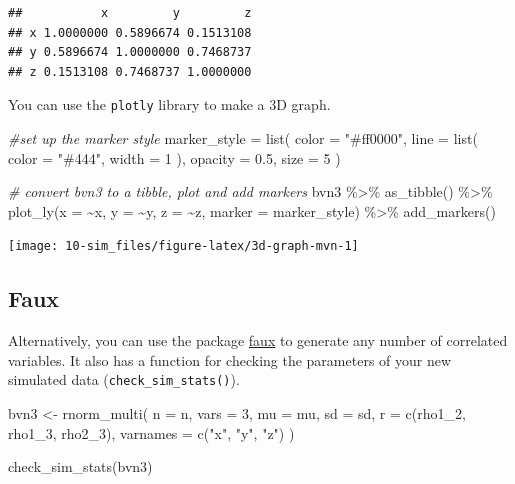 \documentclass[
  oneside]{book}
\newenvironment{Shaded}{\begin{snugshade}}{\end{snugshade}}
\newcommand{\AttributeTok}[1]{\textcolor[rgb]{0.77,0.63,0.00}{#1}}
\newcommand{\CommentTok}[1]{\textcolor[rgb]{0.56,0.35,0.01}{\textit{#1}}}
\newcommand{\DecValTok}[1]{\textcolor[rgb]{0.00,0.00,0.81}{#1}}
\newcommand{\FloatTok}[1]{\textcolor[rgb]{0.00,0.00,0.81}{#1}}
\newcommand{\FunctionTok}[1]{\textcolor[rgb]{0.00,0.00,0.00}{#1}}
\newcommand{\NormalTok}[1]{#1}
\newcommand{\OtherTok}[1]{\textcolor[rgb]{0.56,0.35,0.01}{#1}}
\newcommand{\SpecialCharTok}[1]{\textcolor[rgb]{0.00,0.00,0.00}{#1}}
\newcommand{\StringTok}[1]{\textcolor[rgb]{0.31,0.60,0.02}{#1}}
\begin{document}
\begin{verbatim}
##           x         y         z
## x 1.0000000 0.5896674 0.1513108
## y 0.5896674 1.0000000 0.7468737
## z 0.1513108 0.7468737 1.0000000
\end{verbatim}

You can use the \texttt{plotly} library to make a 3D graph.

\begin{Shaded}
\begin{Highlighting}[]
\CommentTok{\#set up the marker style}
\NormalTok{marker\_style }\OtherTok{=} \FunctionTok{list}\NormalTok{(}
    \AttributeTok{color =} \StringTok{"\#ff0000"}\NormalTok{, }
    \AttributeTok{line =} \FunctionTok{list}\NormalTok{(}
      \AttributeTok{color =} \StringTok{"\#444"}\NormalTok{, }
      \AttributeTok{width =} \DecValTok{1}
\NormalTok{    ), }
    \AttributeTok{opacity =} \FloatTok{0.5}\NormalTok{,}
    \AttributeTok{size =} \DecValTok{5}
\NormalTok{  )}

\CommentTok{\# convert bvn3 to a tibble, plot and add markers}
\NormalTok{bvn3 }\SpecialCharTok{\%\textgreater{}\%}
  \FunctionTok{as\_tibble}\NormalTok{() }\SpecialCharTok{\%\textgreater{}\%}
  \FunctionTok{plot\_ly}\NormalTok{(}\AttributeTok{x =} \SpecialCharTok{\textasciitilde{}}\NormalTok{x, }\AttributeTok{y =} \SpecialCharTok{\textasciitilde{}}\NormalTok{y, }\AttributeTok{z =} \SpecialCharTok{\textasciitilde{}}\NormalTok{z, }\AttributeTok{marker =}\NormalTok{ marker\_style) }\SpecialCharTok{\%\textgreater{}\%}
  \FunctionTok{add\_markers}\NormalTok{()}
\end{Highlighting}
\end{Shaded}

\begin{center}\texttt{[image: 10-sim\_files/figure-latex/3d-graph-mvn-1]} \end{center}

\hypertarget{faux}{%
\subsection{Faux}\label{faux}}

Alternatively, you can use the package \href{https://debruine.github.io/faux/}{faux} to generate any number of correlated variables. It also has a function for checking the parameters of your new simulated data (\texttt{check\_sim\_stats()}).

\begin{Shaded}
\begin{Highlighting}[]
\NormalTok{bvn3 }\OtherTok{\textless{}{-}} \FunctionTok{rnorm\_multi}\NormalTok{(}
  \AttributeTok{n =}\NormalTok{ n, }
  \AttributeTok{vars =} \DecValTok{3}\NormalTok{,}
  \AttributeTok{mu =}\NormalTok{ mu, }
  \AttributeTok{sd =}\NormalTok{ sd,}
  \AttributeTok{r =} \FunctionTok{c}\NormalTok{(rho1\_2, rho1\_3, rho2\_3),}
  \AttributeTok{varnames =} \FunctionTok{c}\NormalTok{(}\StringTok{"x"}\NormalTok{, }\StringTok{"y"}\NormalTok{, }\StringTok{"z"}\NormalTok{)}
\NormalTok{)}

\FunctionTok{check\_sim\_stats}\NormalTok{(bvn3)}
\end{Highlighting}
\end{Shaded}
\end{document}
